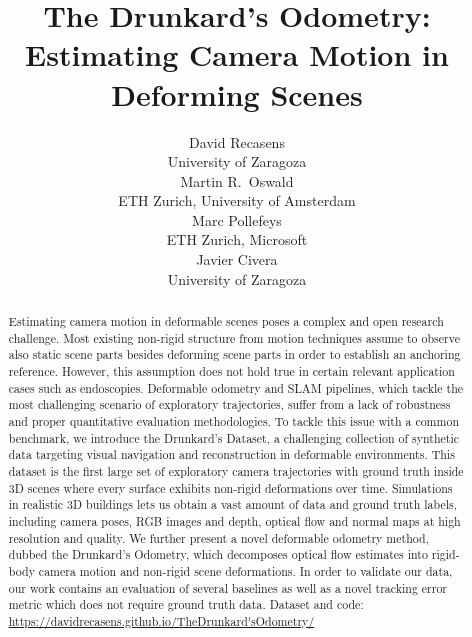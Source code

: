 \documentclass{article}
\title{The Drunkard’s Odometry: Estimating Camera Motion in Deforming Scenes}
\author{David Recasens \\
  University of Zaragoza\\  
  \And
  Martin R.~Oswald \\
  ETH Zurich, University of Amsterdam \\
  \And
  Marc Pollefeys \\
  ETH Zurich, Microsoft \\
  \And
  Javier Civera \\
  University of Zaragoza \\  
}
\begin{document}
\maketitle

\begin{abstract}
    Estimating camera motion in deformable scenes poses a complex and open research challenge. 
    Most existing non-rigid structure from motion techniques assume to observe also static scene parts besides deforming scene parts in order to establish an anchoring reference. However, this assumption does not hold true in certain relevant application cases such as endoscopies. Deformable odometry and SLAM pipelines, which tackle the most challenging scenario of exploratory trajectories, suffer from a lack of robustness and proper quantitative evaluation methodologies. To tackle this issue with a common benchmark, we introduce the Drunkard's Dataset, a challenging collection of synthetic data targeting visual navigation and reconstruction in deformable environments. This dataset is the first large set of exploratory camera trajectories with ground truth inside 3D scenes where every surface exhibits non-rigid deformations over time. Simulations in realistic 3D buildings lets us obtain a vast amount of data and ground truth labels, including camera poses, RGB images and depth, optical flow and normal maps at high resolution and quality.
    We further present a novel deformable odometry method, dubbed the Drunkard’s Odometry, which decomposes optical flow estimates into rigid-body camera motion and non-rigid scene deformations.
    In order to validate our data, our work contains an evaluation of several baselines as well as a novel tracking error metric which does not require ground truth data.
    Dataset and code: \url{https://davidrecasens.github.io/TheDrunkard'sOdometry/}
\end{abstract}
\end{document}
